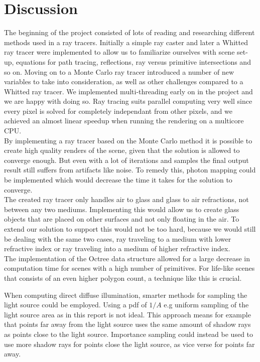 \documentclass[a4paper, 12pt]{report}
\begin{document}
\chapter{Discussion} \label{ch:discussion}
The beginning of the project consisted of lots of reading and researching different methods used in a ray tracers.
Initially a simple ray caster and later a Whitted ray tracer were implemented to allow us to familiarize ourselves with scene set-up, equations for path tracing, reflections, ray versus primitive intersections and so on.
Moving on to a Monte Carlo ray tracer introduced a number of new variables to take into consideration, as well as other challenges compared to a Whitted ray tracer.
We implemented multi-threading early on in the project and we are happy with doing so.
Ray tracing suits parallel computing very well since every pixel is solved for completely independant from other pixels, and we achieved an almost linear speedup when running the rendering on a multicore CPU.\\

By implementing a ray tracer based on the Monte Carlo method it is possible to create high quality renders of the scene, given that the solution is allowed to converge enough.
But even with a lot of iterations and samples the final output result still suffers from artifacts like noise.
To remedy this, photon mapping could be implemented which would decrease the time it takes for the solution to converge.\\

The created ray tracer only handles air to glass and glass to air refractions, not between any two mediums.
Implementing this would allow us to create glass objects that are placed on other surfaces and not only floating in the air.
To extend our solution to support this would not be too hard, because we would still be dealing with the same two cases, ray traveling to a medium with lower refractive index or ray traveling into a medium of higher refractive index.
\\

The implementation of the Octree data structure allowed for a large decrease in computation time for scenes with a high number of primitives. For life-like scenes that consists of an even higher polygon count, a technique like this is crucial.

When computing direct diffuse illumination, smarter methods for sampling the light source could be employed.
Using a pdf of $1/A$ e.g uniform sampling of the light source area as in this report is not ideal.
This approach means for example that points far away from the light source uses the same amount of shadow rays as points close to the light source.
Importance sampling could instead be used to use more shadow rays for points close the light source, as vice verse for points far away.



\end{document}
